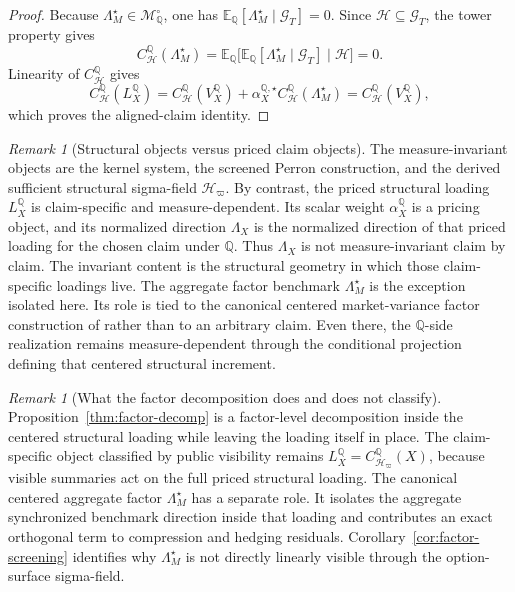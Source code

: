 \documentclass[11pt,a4paper]{amsart}
\theoremstyle{plain}
\theoremstyle{definition}
\theoremstyle{remark}
\newtheorem{remark}[theorem]{Remark}
\newcommand{\QQ}{\mathbb{Q}}
\newcommand{\EE}{\mathbb{E}}
\newcommand{\cG}{\mathcal{G}}
\newcommand{\cH}{\mathcal{H}}
\newcommand{\cM}{\mathcal{M}}
\begin{document}
\begin{proof}
Because \(\Lambda_M^\star\in \cM_\QQ^\circ\), one has
\(\EE_\QQ[\Lambda_M^\star\mid \cG_T]=0\).  Since \(\cH\subseteq \cG_T\), the tower property gives
\[
        C_{\cH}^\QQ(\Lambda_M^\star)
        =
        \EE_\QQ\bigl[\EE_\QQ[\Lambda_M^\star\mid \cG_T]\mid \cH\bigr]
        =0.
\]
Linearity of \(C_{\cH}^\QQ\) gives
\[
        C_{\cH}^\QQ(L_X^\QQ)
        =
        C_{\cH}^\QQ(V_X^\QQ)
        +
        \alpha_X^{\QQ,\star}C_{\cH}^\QQ(\Lambda_M^\star)
        =
        C_{\cH}^\QQ(V_X^\QQ),
\]
which proves the aligned-claim identity.
\end{proof}

\begin{remark}[Structural objects versus priced claim objects]\label{rem:struct-vs-priced}
The measure-invariant objects are the kernel system, the screened Perron construction, and the
derived sufficient structural sigma-field \(\cH_\varpi\).  By contrast, the priced structural
loading \(L_X^\QQ\) is claim-specific and measure-dependent.  Its scalar weight
\(\alpha_X^\QQ\) is a pricing object, and its normalized direction \(\Lambda_X\) is the normalized
direction of that priced loading for the chosen claim under \(\QQ\).  Thus \(\Lambda_X\) is not
measure-invariant claim by claim.  The invariant content is the structural geometry in which those
claim-specific loadings live.  The aggregate factor benchmark \(\Lambda_M^\star\) is the exception
isolated here.  Its role is tied to the canonical centered market-variance factor construction of
\cite{vidal2026market} rather than to an arbitrary claim.  Even there, the \(\QQ\)-side realization remains
measure-dependent through the conditional projection defining that centered structural increment.
\end{remark}

\begin{remark}[What the factor decomposition does and does not classify]\label{rem:factor-scope}
Proposition~\ref{thm:factor-decomp} is a factor-level decomposition inside the centered structural
loading while leaving the loading itself in place.  The claim-specific object classified by public
visibility remains \(L_X^\QQ=C_{\cH_\varpi}^\QQ(X)\), because visible summaries act on the full
priced structural loading.  The canonical centered aggregate factor \(\Lambda_M^\star\) has a
separate role.  It isolates the aggregate synchronized benchmark direction inside that loading and
contributes an exact orthogonal term to compression and hedging residuals.  Corollary~\ref{cor:factor-screening}
identifies why \(\Lambda_M^\star\) is not directly linearly visible through the option-surface
sigma-field.
\end{remark}
\end{document}
